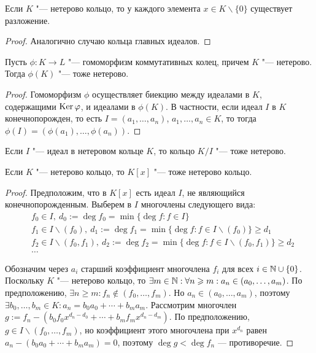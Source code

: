 \begin{corollary}
	Если $K$ "--- нетерово кольцо, то у каждого элемента $x \in K \backslash \{0\}$ существует разложение.
\end{corollary}

\begin{proof}
	Аналогично случаю кольца главных идеалов.
\end{proof}

\begin{proposition}
	Пусть $\phi: K \to L$ "--- гомоморфизм коммутативных колец, причем $K$ "--- нетерово. Тогда $\phi(K)$ "--- тоже нетерово.
\end{proposition}

\begin{proof}
	Гомоморфизм $\phi$ осуществляет биекцию между идеалами в $K$, содержащими $\operatorname{Ker}\varphi$, и идеалами в $\phi(K)$. В частности, если идеал $I$ в $K$ конечнопорожден, то есть $I = (a_1, \dotsc, a_n)$, $a_1, \dotsc, a_n \in K$, то тогда $\phi(I) = (\phi(a_1), \dotsc, \phi(a_n))$.
\end{proof}

\begin{corollary}
	Если $I$ "--- идеал в нетеровом кольце $K$, то кольцо $K / I$ "--- тоже нетерово.
\end{corollary}

\begin{theorem}
	Если $K$ "--- нетерово кольцо, то $K[x]$ "--- тоже нетерово кольцо.
\end{theorem}

\begin{proof}
	Предположим, что в $K[x]$ есть идеал $I$, не являющийся конечнопорожденным. Выберем в $I$ многочлены следующего вида:
	\begin{align*}
		&f_0 \in I,~d_0 := \deg{f_0} = \min\{\deg{f} : f \in I\}\\
		&f_1 \in I\backslash(f_0),~d_1 := \deg{f_1} = \min\{\deg{f} : f \in I\backslash(f_0)\} \ge d_1\\
		&f_2 \in I\backslash(f_0, f_1),~d_2 := \deg{f_2} = \min\{\deg{f} : f \in I\backslash(f_0, f_1)\} \ge d_2\\
		&\dotsc
	\end{align*}
	
	Обозначим через $a_i$ старший коэффициент многочлена $f_i$ для всех $i \in \mathbb{N} \cup \{0\}$. Поскольку $K$ "--- нетерово кольцо, то $\exists m \in \mathbb{N}: \forall n \geqslant m: a_n \in (a_0, \dotsc, a_m)$. По предположению, $\exists n \ge m: f_n \not\in (f_0, \dotsc, f_m)$. Но $a_n \in (a_0, \dotsc, a_m)$, поэтому $\exists b_0, \dotsc, b_m \in K: a_n = b_0a_0 + \dotsb + b_ma_m$. Рассмотрим многочлен $g := f_n - (b_0f_0x^{d_n - d_0} + \dotsb + b_mf_mx^{d_n - d_m})$. По предположению, $g \in I\backslash(f_0, \dotsc, f_m)$, но коэффициент этого многочлена при $x^{d_n}$ равен $a_n - (b_0a_0 + \dotsb + b_ma_m) = 0$, поэтому $\deg{g} < \deg{f_n}$ --- противоречие.
\end{proof}